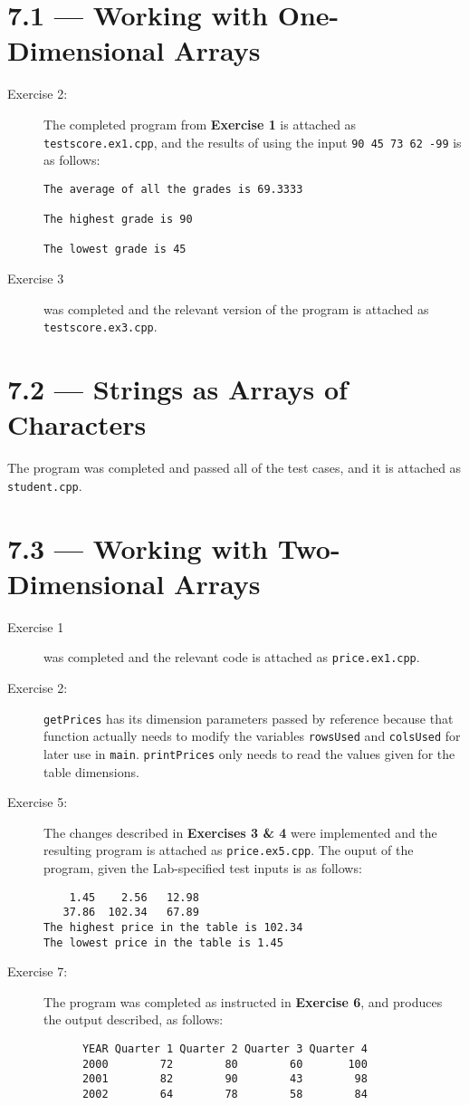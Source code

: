 \documentclass[11pt]{article}
\begin{document}
\section*{7.1 --- Working with One-Dimensional Arrays}
\begin{description}
    \item[Exercise 2:] The completed program from \textbf{Exercise 1} is attached as \texttt{testscore.ex1.cpp}, and the results of using the input \texttt{90 45 73 62 -99} is as follows: \begin{verbatim}
The average of all the grades is 69.3333

The highest grade is 90

The lowest grade is 45
    \end{verbatim}
    \item[Exercise 3] was completed and the relevant version of the program is attached as \texttt{testscore.ex3.cpp}.
\end{description}

\section*{7.2 --- Strings as Arrays of Characters}
    The program was completed and passed all of the test cases, and it is attached as \texttt{student.cpp}.

\section*{7.3 --- Working with Two-Dimensional Arrays}
\begin{description}
    \item[Exercise 1] was completed and the relevant code is attached as \texttt{price.ex1.cpp}.
    \item[Exercise 2:] \lstinline{getPrices} has its dimension parameters passed by reference because that function actually needs to modify the variables \lstinline{rowsUsed} and \lstinline{colsUsed} for later use in \lstinline{main}. \lstinline{printPrices} only needs to read the values given for the table dimensions.
    \item[Exercise 5:] The changes described in \textbf{Exercises 3 \& 4} were implemented and the resulting program is attached as \texttt{price.ex5.cpp}. The ouput of the program, given the Lab-specified test inputs is as follows: \begin{verbatim}
    1.45    2.56   12.98
   37.86  102.34   67.89
The highest price in the table is 102.34
The lowest price in the table is 1.45
\end{verbatim}
    \item[Exercise 7:] The program was completed as instructed in \textbf{Exercise 6}, and produces the output described, as follows: \begin{verbatim}
      YEAR Quarter 1 Quarter 2 Quarter 3 Quarter 4
      2000        72        80        60       100
      2001        82        90        43        98
      2002        64        78        58        84
\end{verbatim}
\end{description}
\end{document}

